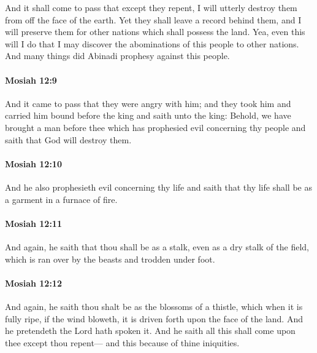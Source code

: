 			And it shall come to pass that except they repent,
			I will utterly destroy them from off the face of the earth.
			Yet they shall leave a record behind them,
			and I will preserve them for other nations which shall possess the land.
			Yea, even this will I do
			that I may discover the abominations of this people to other nations.
			And many things did Abinadi prophesy against this people.

		\paragraph{Mosiah 12:9} %
			\label{MOSIAH-12-9}

			And it came to pass that they were angry with him;
			and they took him and carried him bound before the king
			and saith unto the king:
			Behold, we have brought a man before thee
			which has prophesied evil concerning thy people
			and saith that God will destroy them.

		\paragraph{Mosiah 12:10} %
			\label{MOSIAH-12-10}

			And he also prophesieth evil concerning thy life
			and saith that thy life shall be as a garment in a furnace of fire.

		\paragraph{Mosiah 12:11} %
			\label{MOSIAH-12-11}

			And again, he saith that thou shall be as a stalk,
			even as a dry stalk of the field,
			which is ran over by the beasts and trodden under foot.

		\paragraph{Mosiah 12:12} %
			\label{MOSIAH-12-12}

			And again, he saith thou shalt be as the blossoms of a thistle,
			which when it is fully ripe, if the wind bloweth,
			it is driven forth upon the face of the land.
			And he pretendeth the Lord hath spoken it.
			And he saith all this shall come upon thee except thou repent---
			and this because of thine iniquities.


